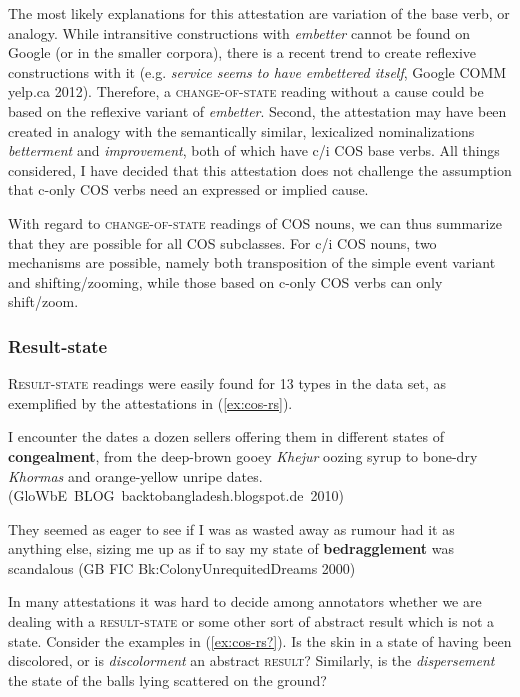 \noindent The most likely explanations for this attestation are variation of the base verb, or analogy. 
While intransitive constructions with \textit{embetter} cannot be found on Google (or in the smaller corpora), there is a recent trend to create reflexive constructions with it (e.g. \textit{service seems to have embettered itself}, Google COMM yelp.ca 2012). Therefore, a \textsc{change-of-state} reading without a cause could be based on the reflexive variant of \textit{embetter}.
Second, the attestation may have been created in analogy with the semantically similar, lexicalized nominalizations \textit{betterment} and \textit{improvement}, both of which have c/i COS base verbs.
All things considered, I have decided that this attestation does not challenge the assumption that c-only COS verbs need an expressed or implied cause.

With regard to \textsc{change-of-state} readings of COS nouns, we can thus summarize that they are possible for all COS subclasses. For c/i COS nouns, two mechanisms are possible, namely both transposition of the simple event variant and shifting/zooming, while those based on c-only COS verbs can only shift/zoom. 

\subsubsection{{Result-state}}
\textsc{Result-state} readings were easily found for 13 types in the data set, as exemplified by the attestations in (\ref{ex:cos-rs}). 

\begin{exe}
  \ex \label{ex:cos-rs}  
  \begin{xlist} 
    \item I encounter the dates  \textendash{}  a dozen sellers offering them in different states of \textbf{congealment}, from the deep-brown gooey \textit{Khejur} oozing syrup to bone-dry \textit{Khormas} and orange-yellow unripe dates.\\\hbox{}\hfill\hbox{\small(\acs{GloWbE} BLOG backtobangladesh.blogspot.de 2010)}
    \item They seemed as eager to see if I was as wasted away as rumour had it as anything else, sizing me up as if to say my state of \textbf{bedragglement} was scandalous {\small(\acs{GB} FIC Bk:ColonyUnrequitedDreams 2000)}
  \end{xlist}
\end{exe}

\noindent In many attestations it was hard to decide among annotators whether we are dealing with a \textsc{result-state} or some other sort of abstract result which is not a state. Consider the examples in (\ref{ex:cos-rs?}). Is the skin in a state of having been discolored, or is \textit{discolorment} an abstract \textsc{result}? Similarly, is the \textit{dispersement} the state of the balls lying scattered on the ground? 

